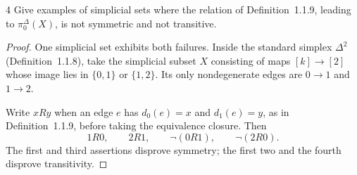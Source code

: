 \begin{exercise}{4}
Give examples of simplicial sets where the relation of
Definition~1.1.9, leading to $\pi_0^\Delta(X)$, is not symmetric and not
transitive.

\begin{proof}
One simplicial set exhibits both failures. Inside the standard simplex
$\Delta^2$ (Definition~1.1.8), take the simplicial subset $X$ consisting
of maps $[k]\to[2]$ whose image lies in $\{0,1\}$ or $\{1,2\}$.
Its only nondegenerate edges are $0\to1$ and $1\to2$.

Write $xRy$ when an edge $e$ has $d_0(e)=x$ and $d_1(e)=y$, as in
Definition~1.1.9, before taking the equivalence closure. Then
\[
 1R0,\qquad 2R1,\qquad \neg(0R1),\qquad \neg(2R0).
\]
The first and third assertions disprove symmetry; the first two and
the fourth disprove transitivity.
\end{proof}
\end{exercise}
